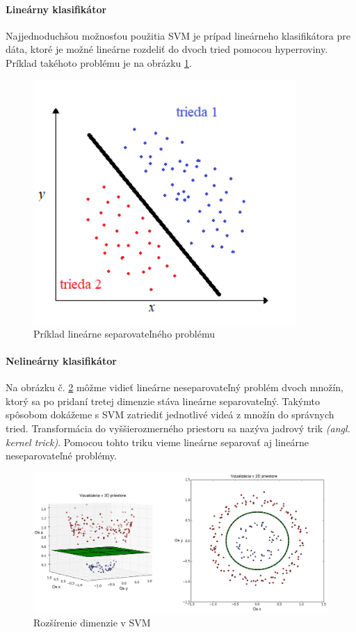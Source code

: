 \paragraph{Lineárny klasifikátor}
Najjednoduchšou možnosťou použitia SVM je prípad lineárneho klasifikátora pre dáta, ktoré je možné lineárne rozdeliť do dvoch tried pomocou hyperroviny. Príklad takéhoto problému je na obrázku \ref{LinSep}.

\begin{figure}[H]
  \centering
  \includegraphics[width=10cm]{img/linsep.png}
  \caption{Príklad lineárne separovateľného problému}
  \label{LinSep}
\end{figure}


\paragraph{Nelineárny klasifikátor}
Na obrázku č. \ref{SVMobr} môžme vidieť lineárne neseparovateľný problém dvoch množín, ktorý sa po pridaní tretej dimenzie stáva lineárne separovateľný. Takýmto spôsobom dokážeme s SVM zatriediť jednotlivé videá z množín do správnych tried. Transformácia do vyššierozmerného priestoru sa nazýva jadrový trik \textit{(angl. kernel trick)}. Pomocou tohto triku vieme lineárne separovať aj lineárne neseparovateľné problémy.\cite{c12}

\begin{figure}[H]
  \centering
  \includegraphics[width=16cm]{img/SVM.png}
  \caption{Rozšírenie dimenzie v SVM}
  \label{SVMobr}
\end{figure}

